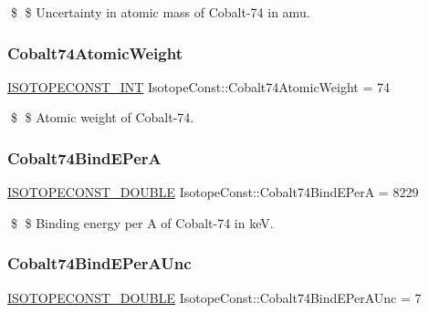 \$ \$ Uncertainty in atomic mass of Cobalt-\/74 in amu. \mbox{\label{group___isotope_const-_cobalt-_co74_gab78d5707a5bb6652a98d4e4ccbe3a71e}} 
\subsubsection{\texorpdfstring{Cobalt74\+Atomic\+Weight}{Cobalt74AtomicWeight}}
{\footnotesize\ttfamily \mbox{\hyperlink{group___isotope_const-_macros_ga5f18360b3e99483a35c32d789e62621c}{I\+S\+O\+T\+O\+P\+E\+C\+O\+N\+S\+T\+\_\+\+I\+NT}} Isotope\+Const\+::\+Cobalt74\+Atomic\+Weight = 74}

\$ \$ Atomic weight of Cobalt-\/74. \mbox{\label{group___isotope_const-_cobalt-_co74_ga44184534d104fbcc7371c65c0b92352a}} 
\subsubsection{\texorpdfstring{Cobalt74\+Bind\+E\+PerA}{Cobalt74BindEPerA}}
{\footnotesize\ttfamily \mbox{\hyperlink{group___isotope_const-_macros_ga8f45a7272ce02c0b4c65c44636ed719a}{I\+S\+O\+T\+O\+P\+E\+C\+O\+N\+S\+T\+\_\+\+D\+O\+U\+B\+LE}} Isotope\+Const\+::\+Cobalt74\+Bind\+E\+PerA = 8229}

\$ \$ Binding energy per A of Cobalt-\/74 in keV. \mbox{\label{group___isotope_const-_cobalt-_co74_ga5351a51d3e96e52ecc1d9ec928ad98c2}} 
\subsubsection{\texorpdfstring{Cobalt74\+Bind\+E\+Per\+A\+Unc}{Cobalt74BindEPerAUnc}}
{\footnotesize\ttfamily \mbox{\hyperlink{group___isotope_const-_macros_ga8f45a7272ce02c0b4c65c44636ed719a}{I\+S\+O\+T\+O\+P\+E\+C\+O\+N\+S\+T\+\_\+\+D\+O\+U\+B\+LE}} Isotope\+Const\+::\+Cobalt74\+Bind\+E\+Per\+A\+Unc = 7}

